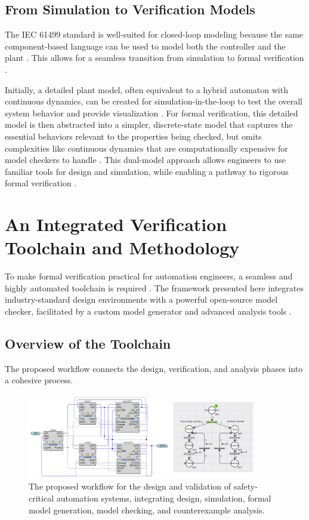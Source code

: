 \subsection{From Simulation to Verification Models}

The IEC 61499 standard is well-suited for closed-loop modeling because the same component-based language can be used to model both the controller and the plant . This allows for a seamless transition from simulation to formal verification .

Initially, a detailed plant model, often equivalent to a hybrid automaton with continuous dynamics, can be created for simulation-in-the-loop to test the overall system behavior and provide visualization . For formal verification, this detailed model is then abstracted into a simpler, discrete-state model that captures the essential behaviors relevant to the properties being checked, but omits complexities like continuous dynamics that are computationally expensive for model checkers to handle . This dual-model approach allows engineers to use familiar tools for design and simulation, while enabling a pathway to rigorous formal verification .

\section{An Integrated Verification Toolchain and Methodology}\label{sec:toolchain}

To make formal verification practical for automation engineers, a seamless and highly automated toolchain is required . The framework presented here integrates industry-standard design environments with a powerful open-source model checker, facilitated by a custom model generator and advanced analysis tools .

\subsection{Overview of the Toolchain}

The proposed workflow connects the design, verification, and analysis phases into a cohesive process.

\begin{figure}[h]
\centering
\includegraphics[width=0.9\textwidth]{chapters/images/chapter2/system_functional_model.png}
\caption{The proposed workflow for the design and validation of safety-critical automation systems, integrating design, simulation, formal model generation, model checking, and counterexample analysis.}
\label{fig:workflow}
\end{figure}

